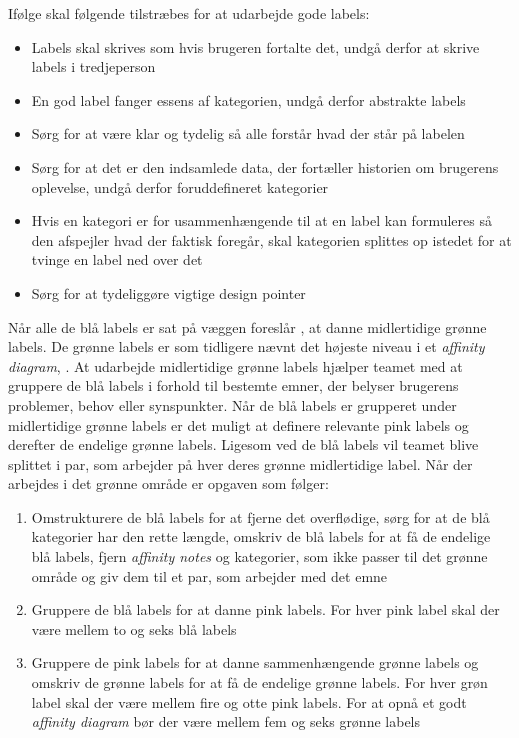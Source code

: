 Ifølge \textcite[s. 172]{Book:BuildingAnAffinity} skal følgende tilstræbes for at udarbejde gode labels: \blankline
%
\begin{itemize}
  \item Labels skal skrives som hvis brugeren fortalte det, undgå derfor at skrive labels i tredjeperson
  \item En god label fanger essens af kategorien, undgå derfor abstrakte labels
  \item Sørg for at være klar og tydelig så alle forstår hvad der står på labelen
  \item Sørg for at det er den indsamlede data, der fortæller historien om brugerens oplevelse, undgå derfor foruddefineret kategorier 
  \item Hvis en kategori er for usammenhængende til at en label kan formuleres så den afspejler hvad der faktisk foregår, skal kategorien splittes op istedet for at tvinge en label ned over det
  \item Sørg for at tydeliggøre vigtige design pointer \blankline  
\end{itemize}
%
Når alle de blå labels er sat på væggen foreslår \textcite[ss. 173-174]{Book:BuildingAnAffinity}, at danne midlertidige grønne labels. De grønne labels er som tidligere nævnt det højeste niveau i et \textit{affinity diagram}, \textcite[s. 160]{Book:BuildingAnAffinity}. At udarbejde midlertidige grønne labels hjælper teamet med at gruppere de blå labels i forhold til bestemte emner, der belyser brugerens problemer, behov eller synspunkter. Når de blå labels er grupperet under midlertidige grønne labels er det muligt at definere relevante pink labels og derefter de endelige grønne labels. Ligesom ved de blå labels vil teamet blive splittet i par, som arbejder på hver deres grønne midlertidige label. Når der arbejdes i det grønne område er opgaven som følger: \blankline
%
\begin{enumerate}
  \item Omstrukturere de blå labels for at fjerne det overflødige, sørg for at de blå kategorier har den rette længde, omskriv de blå labels for at få de endelige blå labels, fjern \textit{affinity notes} og kategorier, som ikke passer til det grønne område og giv dem til et par, som arbejder med det emne
  \item Gruppere de blå labels for at danne pink labels. For hver pink label skal der være mellem to og seks blå labels
  \item Gruppere de pink labels for at danne sammenhængende grønne labels og omskriv de grønne labels for at få de endelige grønne labels. For hver grøn label skal der være mellem fire og otte pink labels. For at opnå et godt \textit{affinity diagram} bør der være mellem fem og seks grønne labels\blankline
\end{enumerate}
